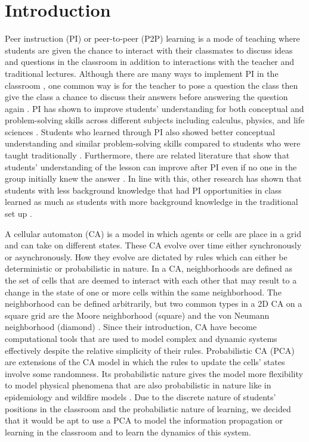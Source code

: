 \documentclass[10pt,a4paper,twoside]{article}
\begin{document}
\section{Introduction}\label{sec:intro}
Peer instruction (PI) or peer-to-peer (P2P) learning is a mode of teaching where students are given the chance to interact with their classmates to discuss ideas and questions in the classroom in addition to interactions with the teacher and traditional lectures. Although there are many ways to implement PI in the classroom \cite{knight2018peer}, one common way is for the teacher to pose a question the class then give the class a chance to discuss their answers before answering the question again \cite{crouch2001peer}. PI has shown to improve students' understanding for both conceptual and problem-solving skills across different subjects including calculus, physics, and life sciences \cite{crouch2001peer,smith2009peer}. Students who learned through PI also showed better conceptual understanding and similar problem-solving skills compared to students who were taught traditionally \cite{lasry2008peer}. Furthermore, there are related literature that show that students' understanding of the lesson can improve after PI even if no one in the group initially knew the answer \cite{smith2009peer}. In line with this, other research has shown that students with less background knowledge that had PI opportunities in class learned as much as students with more background knowledge in the traditional set up \cite{lasry2008peer}.

\noindent A cellular automaton (CA) is a model in which agents or cells are place in a grid and can take on different states. These CA evolve over time either synchronously or asynchronously. How they evolve are dictated by rules which can either be deterministic or probabilistic in nature. In a CA, neighborhoods are defined as the set of cells that are deemed to interact with each other that may result to a change in the state of one or more cells within the same neighborhood. The neighborhood can be defined arbitrarily, but two common types in a 2D CA on a square grid are the Moore neighborhood (square) and the von Neumann neighborhood (diamond) \cite{weisstein2002cellular}. Since their introduction, CA have become computational tools that are used to model complex and dynamic systems effectively despite the relative simplicity of their rules. Probabilistic CA (PCA) are extensions of the CA model in which the rules to update the cells' states involve some randomness. Its probabilistic nature gives the model more flexibility to model physical phenomena that are also probabilistic in nature like in epidemiology and wildfire models \cite{louis2018probabilistic}. Due to the discrete nature of students' positions in the classroom and the probabilistic nature of learning, we decided that it would be apt to use a PCA to model the information propagation or learning in the classroom and to learn the dynamics of this system.
\end{document}
